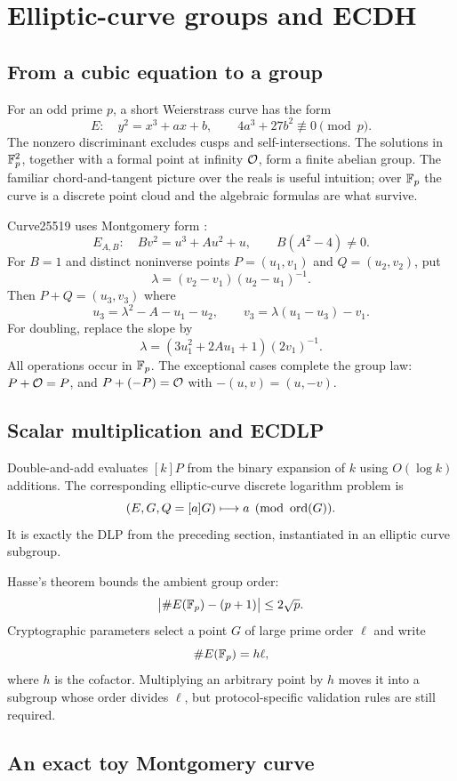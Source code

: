 \section{Elliptic-curve groups and ECDH}

\subsection{From a cubic equation to a group}

For an odd prime $p$, a short Weierstrass curve has the form
\[
  E:\quad y^2=x^3+ax+b,
  \qquad 4a^3+27b^2\not\equiv0\pmod p.
\]
The nonzero discriminant excludes cusps and self-intersections. The solutions
in $\mathbb{F}_p^2$, together with a formal point at infinity $\mathcal{O}$, form a finite
abelian group. The familiar chord-and-tangent picture over the reals is useful
intuition; over $\mathbb{F}_p$ the curve is a discrete point cloud and the algebraic
formulas are what survive.

Curve25519 uses Montgomery form \cite{montgomery1987}:
\[
  E_{A,B}:\quad Bv^2=u^3+Au^2+u,
  \qquad B(A^2-4)\ne0.
\]
For $B=1$ and distinct noninverse points
$P=(u_1,v_1)$ and $Q=(u_2,v_2)$, put
\[
  \lambda=(v_2-v_1)(u_2-u_1)^{-1}.
\]
Then $P+Q=(u_3,v_3)$ where
\[
  u_3=\lambda^2-A-u_1-u_2,
  \qquad
  v_3=\lambda(u_1-u_3)-v_1.
\]
For doubling, replace the slope by
\[
  \lambda=(3u_1^2+2Au_1+1)(2v_1)^{-1}.
\]
All operations occur in $\mathbb{F}_p$. The exceptional cases complete the group law:
$P+\mathcal{O}=P$, and $P+(-P)=\mathcal{O}$ with $-(u,v)=(u,-v)$.

\subsection{Scalar multiplication and ECDLP}

Double-and-add evaluates $[k]P$ from the binary expansion of $k$ using
$O(\log k)$ additions. The corresponding elliptic-curve discrete logarithm
problem is
\[
  (E,G,Q=[a]G)\longmapsto a\pmod{\operatorname{ord}(G)}.
\]
It is exactly the DLP from the preceding section, instantiated in an elliptic
curve subgroup.

Hasse's theorem bounds the ambient group order:
\[
  \bigl|\#E(\mathbb{F}_p)-(p+1)\bigr|\le2\sqrt p.
\]
Cryptographic parameters select a point $G$ of large prime order $\ell$ and
write
\[
  \#E(\mathbb{F}_p)=h\ell,
\]
where $h$ is the cofactor. Multiplying an arbitrary point by $h$ moves it into
a subgroup whose order divides $\ell$, but protocol-specific validation rules
are still required.

\subsection{An exact toy Montgomery curve}


